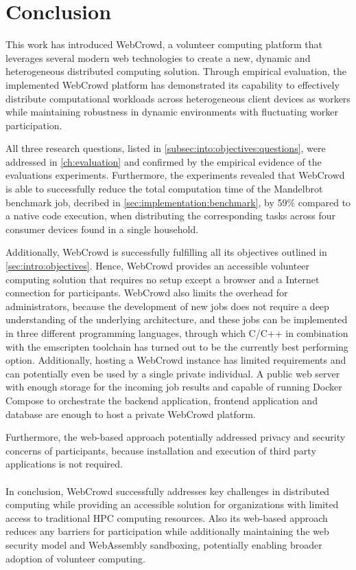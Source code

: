 \chapter{Conclusion}
\label{ch:conclusion}
This work has introduced WebCrowd, a volunteer computing platform that leverages several modern web technologies to create a new, dynamic and heterogeneous distributed computing solution. Through empirical evaluation, the implemented WebCrowd platform has demonstrated its capability to effectively distribute computational workloads across heterogeneous client devices as workers while maintaining robustness in dynamic environments with fluctuating worker participation. 

All three research questions, listed in \autoref{subsec:into:objectives:questions}, were addressed in \autoref{ch:evaluation} and confirmed by the empirical evidence of the evaluations experiments. Furthermore, the experiments revealed that WebCrowd is able to successfully reduce the total computation time of the Mandelbrot benchmark job, decribed in \autoref{sec:implementation:benchmark}, by 59\% compared to a native code execution, when distributing the corresponding tasks across four consumer devices found in a single household.

Additionally, WebCrowd is successfully fulfilling all its objectives outlined in \autoref{sec:intro:objectives}. Hence, WebCrowd provides an accessible volunteer computing solution that requires no setup except a browser and a Internet connection for participants.  WebCrowd also limits the overhead for administrators, because the development of new jobs does not require a deep understanding of the underlying architecture, and these jobs can be implemented in three different programming languages, through which C/C++ in combination with the emscripten \cite{methodology:emcc} toolchain has turned out to be the currently best performing option. Additionally, hosting a WebCrowd instance has limited requirements and can potentially even be used by a single private individual. A public web server with enough storage for the incoming job results and capable of running Docker Compose \cite{conclusion:docker} to orchestrate the backend application, frontend application and database are enough to host a private WebCrowd platform.

Furthermore, the web-based approach potentially addressed privacy and security concerns of participants, because installation and execution of third party applications is not required.
\\~\\
In conclusion, WebCrowd successfully addresses key challenges in distributed computing while providing an accessible solution for organizations with limited access to traditional \ac{HPC} computing resources. Also its web-based approach reduces any barriers for participation while additionally maintaining the web security model and WebAssembly sandboxing, potentially enabling broader adoption of volunteer computing.


